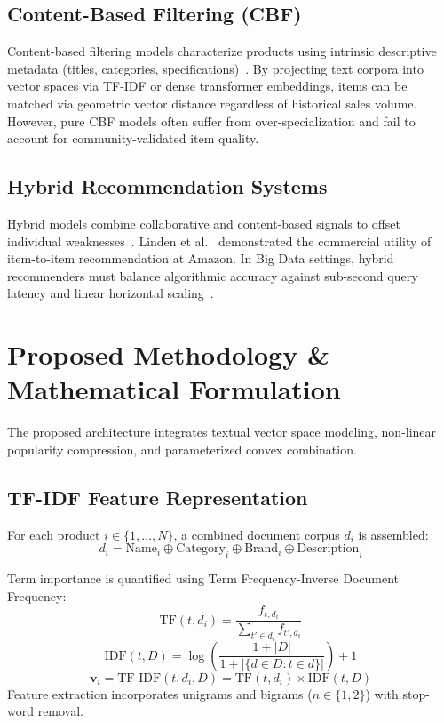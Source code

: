\documentclass[conference]{IEEEtran}
\begin{document}
\subsection{Content-Based Filtering (CBF)}
Content-based filtering models characterize products using intrinsic descriptive metadata (titles, categories, specifications)~\cite{lops2011}. By projecting text corpora into vector spaces via TF-IDF or dense transformer embeddings, items can be matched via geometric vector distance regardless of historical sales volume. However, pure CBF models often suffer from over-specialization and fail to account for community-validated item quality.

\subsection{Hybrid Recommendation Systems}
Hybrid models combine collaborative and content-based signals to offset individual weaknesses~\cite{burke2007}. Linden et al.~\cite{linden2003} demonstrated the commercial utility of item-to-item recommendation at Amazon. In Big Data settings, hybrid recommenders must balance algorithmic accuracy against sub-second query latency and linear horizontal scaling~\cite{zaharia2016}.

\section{Proposed Methodology \& Mathematical Formulation}
The proposed architecture integrates textual vector space modeling, non-linear popularity compression, and parameterized convex combination.

\subsection{TF-IDF Feature Representation}
For each product $i \in \{1, \dots, N\}$, a combined document corpus $d_i$ is assembled:
\begin{equation}
d_i = \text{Name}_i \oplus \text{Category}_i \oplus \text{Brand}_i \oplus \text{Description}_i
\end{equation}

Term importance is quantified using Term Frequency-Inverse Document Frequency:
\begin{equation}
\text{TF}(t, d_i) = \frac{f_{t, d_i}}{\sum_{t' \in d_i} f_{t', d_i}}
\end{equation}
\begin{equation}
\text{IDF}(t, D) = \log\left(\frac{1 + |D|}{1 + |\{d \in D : t \in d\}|}\right) + 1
\end{equation}
\begin{equation}
\mathbf{v}_i = \text{TF-IDF}(t, d_i, D) = \text{TF}(t, d_i) \times \text{IDF}(t, D)
\end{equation}
Feature extraction incorporates unigrams and bigrams ($n \in \{1, 2\}$) with stop-word removal.
\end{document}

